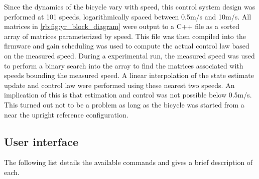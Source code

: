Since the dynamics of the bicycle vary with speed, this control system design
was performed at 101 speeds, logarithmically spaced between 0.5m/s and 10m/s.
All matrices in \autoref{rb:fig:yr_block_diagram} were output to a C++ file as
a sorted array of matrices parameterized by speed. This file was then compiled
into the firmware and gain scheduling was used to compute the actual control
law based on the measured speed. During a experimental run, the measured speed
was used to perform a binary search into the array to find the matrices
associated with speeds bounding the measured speed. A linear interpolation of
the state estimate update and control law were performed using these nearest
two speeds.  An implication of this is that estimation and control was not
possible below 0.5m/s. This turned out not to be a problem as long as the
bicycle was started from a near the upright reference configuration.

\subsection{User interface} \label{rb:subsec:ui}
The following list details the available commands and gives a brief description
of each.

